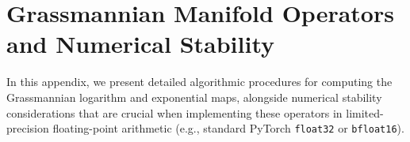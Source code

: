 \documentclass{article}
\theoremstyle{plain}
\theoremstyle{definition}
\theoremstyle{remark}
\begin{document}

\printAffiliationsAndNotice{}











\newpage
\appendix
\onecolumn
\section{Grassmannian Manifold Operators and Numerical Stability}
\label{sec:appendix_stability}

In this appendix, we present detailed algorithmic procedures for computing the Grassmannian logarithm and exponential maps, alongside numerical stability considerations that are crucial when implementing these operators in limited-precision floating-point arithmetic (e.g., standard PyTorch \texttt{float32} or \texttt{bfloat16}).
\end{document}
